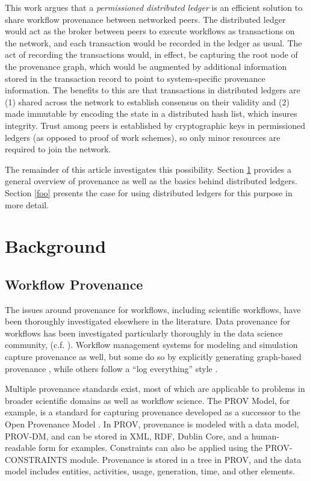 \documentclass[sigconf]{acmart}
\begin{document}
This work argues that a \textit{permissioned distributed ledger} is an efficient solution to share workflow provenance between networked peers. The distributed ledger would act as the broker between peers to execute workflows as transactions on the network, and each transaction would be recorded in the ledger as usual. The act of recording the transactions would, in effect, be capturing the root node of the provenance graph, which would be augmented by additional information stored in the transaction record to point to system-specific provenance information. The benefits to this are that transactions in distributed ledgers are (1) shared across the network to establish consensus on their validity and (2) made immutable by encoding the state in a distributed hash list, which insures integrity. Trust among peers is established by cryptographic keys in permissioned ledgers (as opposed to proof of work schemes), so only minor resources are required to join the network. 

The remainder of this article investigates this possibility. Section \ref{background} provides a general overview of provenance as well as the basics behind distributed ledgers. Section \ref{foo} presents the case for using distributed ledgers for this purpose in more detail.

\section{Background}
\label{background}

\subsection{Workflow Provenance}
The issues around provenance for workflows, including scientific workflows, have been thoroughly investigated elsewhere in the literature. Data provenance for workflows has been investigated particularly thoroughly in the data science community, (c.f. \cite{davidson_provenance_2007}). Workflow management systems for modeling and simulation capture provenance as well, but some do so by explicitly generating graph-based provenance \cite{pizzi_aiida:_2016}, while others follow a ``log everything'' style \cite{billings_eclipse_2017}. 

Multiple provenance standards exist, most of which are applicable to problems in broader scientific domains as well as workflow science. The PROV Model, for example, is a standard for capturing provenance developed as a successor to the Open Provenance Model \cite{noauthor_prov-overview_nodate} \cite{moreau_open_2011}. In PROV, provenance is modeled with a data model, PROV-DM, and can be stored in XML, RDF, Dublin Core, and a human-readable form for examples. Constraints can also be applied using the PROV-CONSTRAINTS module. Provenance is stored in a tree in PROV, and the data model includes entities, activities, usage, generation, time, and other elements. 
\end{document}
